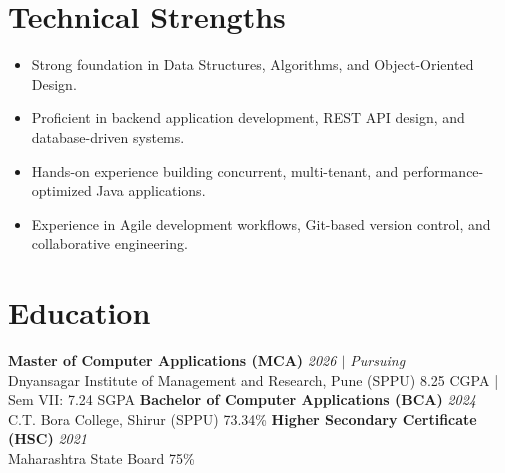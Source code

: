 \documentclass[10.5pt,a4paper]{article}
\begin{document}
\section{Technical Strengths}
\begin{itemize}
  \item Strong foundation in Data Structures, Algorithms, and Object-Oriented Design.
  \item Proficient in backend application development, REST API design, and database-driven systems.
  \item Hands-on experience building concurrent, multi-tenant, and performance-optimized Java applications.
  \item Experience in Agile development workflows, Git-based version control, and collaborative engineering.
\end{itemize}
\section{Education}
\textbf{Master of Computer Applications (MCA)} \hfill \textit{2026 $|$ Pursuing}\\
Dnyansagar Institute of Management and Research, Pune (SPPU) \hfill 8.25 CGPA | Sem VII: 7.24 SGPA
\vspace{2pt}
\textbf{Bachelor of Computer Applications (BCA)} \hfill \textit{2024}\\
C.T. Bora College, Shirur (SPPU) \hfill 73.34\%
\vspace{2pt}
\textbf{Higher Secondary Certificate (HSC)} \hfill \textit{2021}\\
Maharashtra State Board \hfill 75\%
\vspace{2pt}
\end{document}
